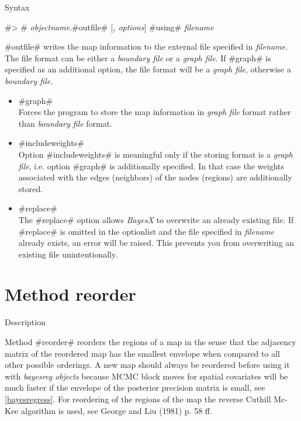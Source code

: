 \begin{stanza}{Syntax}

{#> # {\em objectname}.#outfile# [{\em , options}] #using# {\em filename}

#outfile# writes the map information to the external file
specified in {\em filename}. The file format can be either a {\em
boundary file} or a {\em graph file}. If #graph# is specified as
an additional option, the file format will be a {\em graph file},
otherwise a {\em boundary file}.}
\end{stanza}


\begin{itemize}
\item #graph# \\
Forces the program to store the map information in {\em graph
file} format rather than {\em boundary file} format.
\item #includeweights# \\
Option #includeweights# is meaningful only if the storing format
is a {\em graph file}, i.e. option #graph# is additionally
specified. In that case the weights associated with the edges
(neighbors) of the nodes (regions) are additionally stored.
\item #replace# \\
The #replace# option allows {\em BayesX} to overwrite an already
existing file. If #replace# is omitted in the optionlist and the
file specified in {\em filename} already exists, an error will be
raised. This prevents you from overwriting an existing file
unintentionally.
\end{itemize}



\clearpage



\section{Method reorder}
\label{mapreorder}  

\begin{stanza}{Description}

{Method #reorder# reorders the regions of a map in the sense that
the adjacency matrix of the reordered map has the smallest
envelope when compared to all other possible orderings. A new map
should always be reordered before using it with {\em bayesreg
objects} because MCMC block moves for spatial covariates will be
much faster if the envelope of the posterior precision matrix is
small, see \autoref{bayesregress}. For reordering of the regions
of the map the reverse Cuthill Mc-Kee algorithm is used, see
George and Liu (1981) p. 58 ff.}
\end{stanza}

